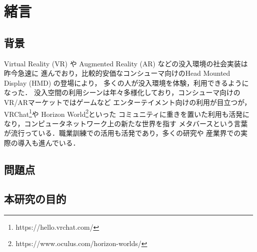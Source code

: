 \chapter{緒言}

\section{背景}

Virtual Reality (VR) や Augmented Reality (AR) などの没入環境の社会実装は昨今急速に
進んでおり，比較的安価なコンシューマ向けのHead Mounted Display (HMD) の登場により，
多くの人が没入環境を体験，利用できるようになった．
没入空間の利用シーンは年々多様化しており，コンシューマ向けのVR/ARマーケットではゲームなど
エンターテイメント向けの利用が目立つが，VRChat\footnote{https://hello.vrchat.com/}や
Horizon World\footnote{https://www.oculus.com/horizon-worlds/}といった
コミュニティに重きを置いた利用も活発になり，コンピュータネットワーク上の新たな世界を指す
メタバースという言葉が流行っている．職業訓練での活用も活発であり，多くの研究や
産業界での実際の導入も進んでいる．


\section{問題点}


\section{本研究の目的}

